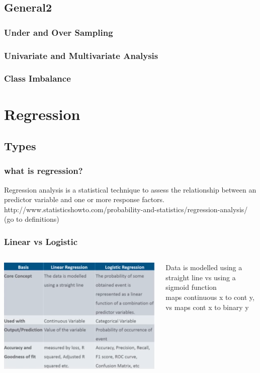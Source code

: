 \documentclass{beamer}
\begin{document}
\subsection{General2}

\begin{frame}\frametitle{Under and Over Sampling}
\end{frame}

\begin{frame}\frametitle{Univariate and Multivariate Analysis}
\end{frame}


\begin{frame}\frametitle{Class Imbalance}
\end{frame}

\section{Regression}


\subsection{Types}

\begin{frame}\frametitle{what is regression?}
	Regression analysis is a statistical technique to assess the relationship between an predictor variable and one or more response factors.\\
	http://www.statisticshowto.com/probability-and-statistics/regression-analysis/
	(go to definitions)
\end{frame}


\begin{frame}\frametitle{Linear vs Logistic}
	\begin{columns}
		\begin{column}{0.6\textwidth}
			\includegraphics[scale=0.45]{regression/linearlogistic}
		\end{column}
		\begin{column}{0.2\textwidth}
			Data is modelled using a straight line vs using a sigmoid function\\
			maps continuous x to cont y, vs maps cont x to binary y 
		\end{column}
	\end{columns}

\end{frame}
\end{document}
